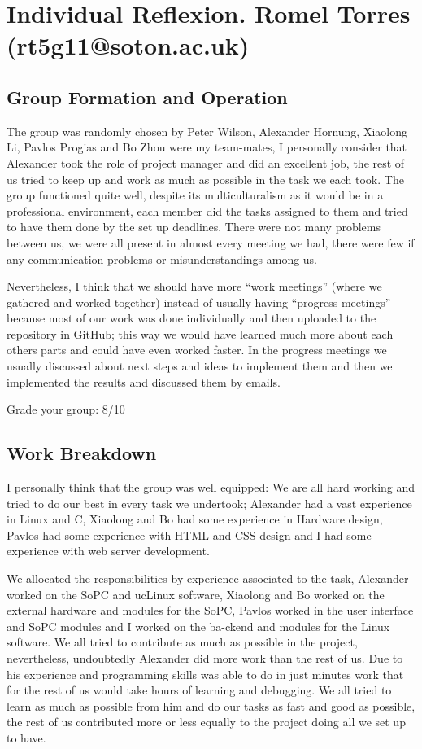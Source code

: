 \chapter{Individual Reflexion. Romel Torres (rt5g11@soton.ac.uk)}

\section{Group Formation and Operation}

The group was randomly chosen by Peter Wilson, Alexander Hornung, Xiaolong Li, Pavlos Progias and Bo Zhou were my team-mates, I personally consider that Alexander 
took the role of project manager and did an excellent job, the rest of us tried to keep up and work as much as possible in the task we each took. The group functioned 
quite well, despite its multiculturalism as it would be in a professional environment, each member did the tasks assigned to them and tried to have them done by the set
 up deadlines. There were not many problems between us, we were all present in almost every meeting we had, there were few if any communication problems or misunderstandings 
among us. 

Nevertheless, I think that we should have more “work meetings” (where we gathered and worked together) instead of usually having “progress meetings” because most
 of our work was done individually and then uploaded to the repository in GitHub; this way we would have learned much more about each others parts and could have even 
worked faster. In the progress meetings we usually discussed about next steps and ideas to implement them and then we implemented the results and discussed them by emails.

Grade your group: 8/10

\section{Work Breakdown}
I personally think that the group was well equipped: We are all hard working and tried to do our best in every task we undertook; Alexander had a vast experience 
in Linux and C, Xiaolong and Bo had some experience in Hardware design, Pavlos had some experience with HTML and CSS design and I had some experience with web 
server development. 

We allocated the responsibilities by experience associated to the task, Alexander worked on the SoPC and ucLinux software, Xiaolong and Bo worked on the external 
hardware and modules for the SoPC, Pavlos worked in the user interface and SoPC modules and I worked on the  ba-ckend and modules for the Linux software. We all 
tried to contribute as much as possible in the project, nevertheless, undoubtedly Alexander did more work than the rest of us. Due to his experience and programming 
skills was able to do in just minutes work that for the rest of us would take hours of learning and debugging. We all tried to learn as much as possible from him 
and do our tasks as fast and good as possible, the rest of us contributed more or less equally to the project doing all we set up to have.

